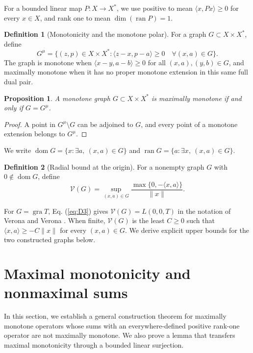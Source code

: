 \documentclass[11pt]{article}
\newcommand{\gra}{\operatorname{gra}}
\newcommand{\dom}{\operatorname{dom}}
\newcommand{\pair}[2]{\langle #1,#2\rangle}
\newtheorem{proposition}{Proposition}
\theoremstyle{definition}
\newtheorem{definition}{Definition}
\theoremstyle{remark}
\begin{document}
For a bounded linear map $P:X\to X^*$, we use positive to mean $\pair{x}{Px}\ge0$ for every $x\in X$, and rank one to mean $\dim(\operatorname{ran}P)=1$.

\begin{definition}[Monotonicity and the monotone polar]
For a graph $G\subset X\times X^*$, define
\begin{equation}
G^\mu=\{(z,p)\in X\times X^*:
 \pair{z-x}{p-a}\ge0\quad\forall(x,a)\in G\}.
\label{eq:D1}
\end{equation}
The graph is monotone when $\pair{x-y}{a-b}\ge0$ for all $(x,a),(y,b)\in G$, and maximally monotone when it has no proper monotone extension in this same full dual pair.
\end{definition}

\begin{proposition}
A monotone graph $G\subset X\times X^*$ is maximally monotone if and only if $G=G^\mu$.
\end{proposition}
\begin{proof}
A point in $G^\mu\setminus G$ can be adjoined to $G$, and every point of a monotone extension belongs to $G^\mu$.
\end{proof}

We write $\dom G=\{x:\exists a,\ (x,a)\in G\}$ and $\operatorname{ran}G=\{a:\exists x,\ (x,a)\in G\}$.


\begin{definition}[Radial bound at the origin]
For a nonempty graph $G$ with $0\notin\dom G$, define
\begin{equation}
\mathcal V(G)=\sup_{(x,a)\in G}
 \frac{\max\{0,-\pair{x}{a}\}}{\|x\|}.
\label{eq:D3}
\end{equation}
\end{definition}
For $G=\gra T$, Eq. (\ref{eq:D3}) gives $\mathcal V(G)=L(0,0,T)$ in the notation of Verona and Verona \cite[p.~1004]{verona2008}. When finite, $\mathcal V(G)$ is the least $C\ge0$ such that $\pair{x}{a}\ge-C\|x\|$ for every $(x,a)\in G$. We derive explicit upper bounds for the two constructed graphs below.

\section{Maximal monotonicity and nonmaximal sums}
\label{sec:endpoint-criterion}

In this section, we establish a general construction theorem for maximally monotone operators whose sums with an everywhere-defined positive rank-one operator are not maximally monotone. We also prove a lemma that transfers maximal monotonicity through a bounded linear surjection.
\end{document}
